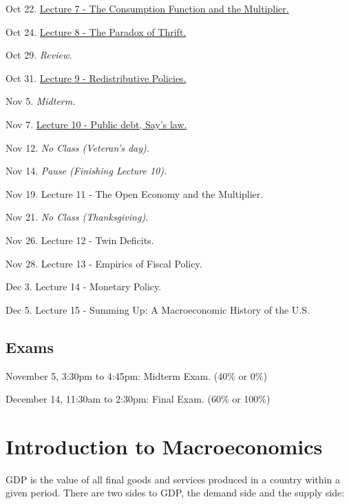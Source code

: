 \documentclass[]{book}
\theoremstyle{definition}
\theoremstyle{definition}
\theoremstyle{definition}
\theoremstyle{remark}
\begin{document}
Oct 22. \href{lecture7.html}{Lecture 7 - The Consumption Function and
the Multiplier.}

Oct 24. \href{lecture8.html}{Lecture 8 - The Paradox of Thrift.}

Oct 29. \emph{Review.}

Oct 31. \href{lecture9.html}{Lecture 9 - Redistributive Policies.}

Nov 5. \emph{Midterm.}

Nov 7. \href{lecture10.html}{Lecture 10 - Public debt, Say's law.}

Nov 12. \emph{No Class (Veteran's day).}

Nov 14. \emph{Pause (Finishing Lecture 10).}

Nov 19. Lecture 11 - The Open Economy and the Multiplier.

Nov 21. \emph{No Class (Thanksgiving).}

Nov 26. Lecture 12 - Twin Deficits.

Nov 28. Lecture 13 - Empirics of Fiscal Policy.

Dec 3. Lecture 14 - Monetary Policy.

Dec 5. Lecture 15 - Summing Up: A Macroeconomic History of the U.S.

\section*{Exams}\label{exams-1}

November 5, 3:30pm to 4:45pm: Midterm Exam. (40\% or 0\%)

December 14, 11:30am to 2:30pm: Final Exam. (60\% or 100\%)

\chapter{Introduction to Macroeconomics}\label{intro}

GDP is the value of all final goods and services produced in a country
within a given period. There are two sides to GDP, the demand side and
the supply side:
\end{document}
